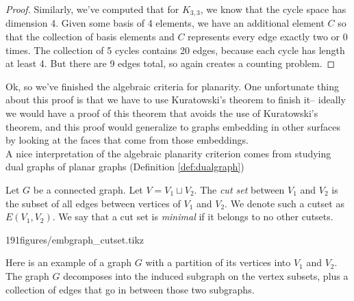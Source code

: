 \begin{proof}
 Similarly, we've computed that for $K_{3,3}$, we know that the cycle space has dimension 4. Given some basis of 4 elements, we have an additional element $C$ so that the collection of basis elements and $C$ represents every edge exactly two or 0 times. The collection of 5 cycles contains 20 edges, because each cycle has length at least 4. But there are 9 edges total, so again creates a counting problem. 
\end{proof}

Ok, so we've finished the algebraic criteria for planarity. One unfortunate thing about this proof is that we have to use Kuratowski's theorem to finish it-- ideally we would have a proof of this theorem that avoids the use of Kuratowski's theorem, and this proof would generalize to graphs embedding in other surfaces by looking at the faces that come from those embeddings.\\
A nice interpretation of the algebraic planarity criterion comes from studying dual graphs of planar graphs (Definition \ref{def:dualgraph})
\begin{definition}
Let $G$ be a connected graph. Let $V=V_1\sqcup V_2$. The \emph{cut set} between $V_1$ and $V_2$ is the subset of all edges between vertices of $V_1$ and $V_2$. We denote such a cutset as $E(V_1, V_2)$. We say that a cut set is \emph{minimal} if it belongs to no other cutsets. 
\end{definition}



\begin{examplefigureenv}{191figures/embgraph_cutset.tikz}

Here is an example of a graph $G$ with a partition of its vertices into $V_1$ and $V_2$. The graph $G$ decomposes into the induced subgraph on the vertex subsets, plus a collection of edges that go in between those two subgraphs. 
\end{examplefigureenv}

